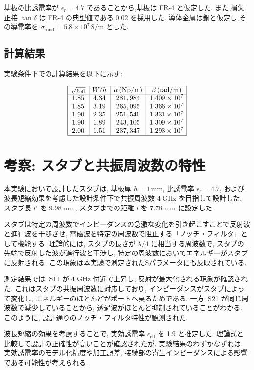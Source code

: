 \documentclass[a4paper, twocolumn]{article} %
\begin{document}
基板の比誘電率が \( \epsilon_r = 4.7 \) であることから,基板は FR-4 と仮定した. また,損失正接 \( \tan\delta \) は FR-4 の典型値である 0.02 を採用した. 導体金属は銅と仮定し,その導電率を \( \sigma_{\text{cond}} = 5.8 \times 10^7 \, \text{S/m} \) とした.

\subsection{計算結果}
実験条件下での計算結果を以下に示す:

\[
\begin{array}{|c|c|c|c|}
\hline
\sqrt{\epsilon_{\text{eff}}} & W/h & \alpha \, (\text{Np/m}) & \beta \, (\text{rad/m}) \\
\hline
1.85 & 4.34 & 281,984 & 1.409 \times 10^7 \\
1.85 & 3.19 & 265,095 & 1.366 \times 10^7 \\
1.90 & 2.35 & 251,540 & 1.331 \times 10^7 \\
1.90 & 1.89 & 243,105 & 1.309 \times 10^7 \\
2.00 & 1.51 & 237,347 & 1.293 \times 10^7 \\
\hline
\end{array}
\]
\section{考察: スタブと共振周波数の特性}

本実験において設計したスタブは, 基板厚 \( h = 1 \, \text{mm} \), 比誘電率 \( \epsilon_r = 4.7 \), および波長短縮効果を考慮した設計条件下で共振周波数 4 GHz を目指して設計した. スタブ長 \( l' \) を 9.98 mm, スタブまでの距離 \( l \) を 7.78 mm に設定した.

スタブは特定の周波数でインピーダンスの急激な変化を引き起こすことで反射波と進行波を干渉させ, 電磁波を特定の周波数で阻止する「ノッチ・フィルタ」として機能する. 理論的には, スタブの長さが \(\lambda / 4\) に相当する周波数で, スタブの先端で反射した波が進行波と干渉し, 特定の周波数においてエネルギーがスタブに反射される. この現象は本実験で測定されたSパラメータにも反映されている.

測定結果では, S11 が 4 GHz 付近で上昇し, 反射が最大化される現象が確認された. これはスタブの共振周波数に対応しており, インピーダンスがスタブによって変化し, エネルギーのほとんどがポートへ戻るためである. 一方, S21 が同じ周波数で減少していることから, 透過波がほとんど抑制されていることがわかる. このように, 設計通りのノッチ・フィルタ特性が観測された.

波長短縮の効果を考慮することで, 実効誘電率 \( \epsilon_{\text{eff}} \) を 1.9 と推定した. 理論式と比較して設計の正確性が高いことが確認されたが, 実験結果のわずかなずれは, 実効誘電率のモデル化精度や加工誤差, 接続部の寄生インピーダンスによる影響である可能性が考えられる.
\end{document}

